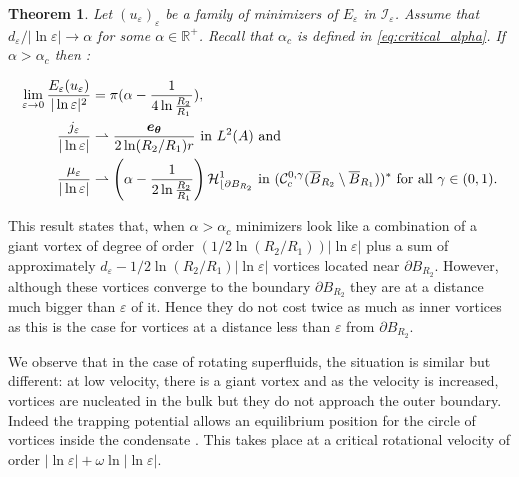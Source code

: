 \documentclass[12pt,reqno]{amsart}
\newtheorem{theorem}{Theorem}[section]
\def\C{{\mathcal C}}
\def\I{{\mathcal I}}
\def\e {{\varepsilon}}
\def\le {|\ln {\varepsilon}|}
\renewcommand{\vec}[1]{\text{\boldmath $#1$}}
\def \p {\partial}
\newcommand{\R}{\mathbb{R}}
\numberwithin{equation}{section}
\begin{document}
\begin{theorem}\label{th:main1}
Let \( (u_\e)_\e\) be a family of minimizers of \(E_\e\) in \({\I}_\e\). Assume that \(d_\e/|\ln \e| \to \alpha \) for some \(\alpha \in \R^+\). Recall that \(\alpha_c\) is defined in \eqref{eq:critical_alpha}.  If \(\alpha> \alpha_c\)  then :


\begin{align*}
\lim_{\e\to 0} \frac{E_\e(u_\e)}{|\ln \e|^2}& =\pi (\alpha-\frac{1}{4\ln \frac{R_2}{R_1}}), \\
\frac{j_\e}{|\ln \e|} & \rightharpoonup \frac{ \vec{e_\theta}}{2\ln (R_2/R_1) r} \text{ in } L^2(A) \text{ and } \\
\frac{\mu_\e}{|\ln \e|} & \rightharpoonup \left(\alpha-\frac{1}{2\ln \frac{R_2}{R_1}}\right)\mathcal{H}^1_{\lfloor \p B_{R_2}}\text{ in }(\C^{0,\gamma}_c(\overline{B}_{R_2}\setminus \overline{B}_{R_1}))^* \text{ for all } \gamma \in (0,1).
\end{align*}
\end{theorem}

  This result states that, when \(\alpha >\alpha_c\) minimizers look like a combination of a giant vortex of degree  of order \( (1/2\ln (R_2/R_1))|\ln \e|\) plus a sum of approximately \( d_\e -1/2\ln (R_2/R_1)|\ln \e|\) vortices located near \(\p B_{R_2}\). However, although these vortices converge to the boundary \(\p B_{R_2}\) they are at a distance much bigger than \(\e\) of it. Hence they do not cost twice as much as inner vortices as this is the case for vortices at a distance less than \(\e\) from \(\p B_{R_2}\).

We observe that in the case of rotating superfluids, the situation is similar but different: at low velocity, there is a giant vortex and as the velocity is increased, vortices are nucleated in the bulk \cite{fetter67,perrin} but they do not approach the outer boundary. Indeed the trapping potential allows an equilibrium position for the circle of vortices inside the condensate \cite{aab}. This takes place at a critical rotational velocity of order $\le+ \omega  \ln \le$. 
\end{document}
